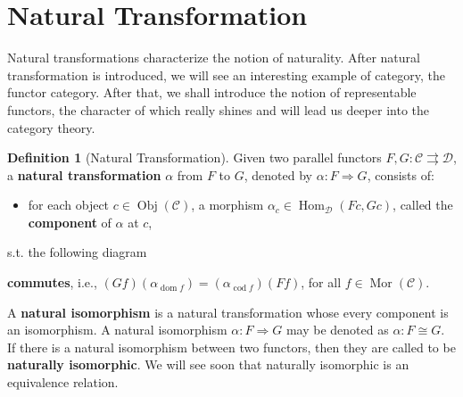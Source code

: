 \documentclass{article}
\theoremstyle{definition}
\newtheorem{definition}{Definition}[section]
\theoremstyle{definition}
\theoremstyle{remark}
\DeclareMathOperator{\Obj}{Obj}
\DeclareMathOperator{\Mor}{Mor}
\DeclareMathOperator{\dom}{dom}
\DeclareMathOperator{\cod}{cod}
\DeclareMathOperator{\Hom}{Hom}
\begin{document}
\section{Natural Transformation}
Natural transformations characterize the notion of naturality. After natural transformation is introduced, we will see an interesting example of category, the functor category. After that, we shall introduce the notion of representable functors, the character of which really shines and will lead us deeper into the category theory.
	\begin{definition}[Natural Transformation]
	Given two parallel functors $F,G:\mathcal{C}\rightrightarrows \mathcal{D}$, a \textbf{natural transformation} $\alpha$ from $F$ to $G$, denoted by $\alpha:F\Rightarrow G$, consists of:
		\begin{itemize}
			\item for each object $c\in\Obj(\mathcal{C})$, a morphism $\alpha_c\in\Hom_\mathcal{D}(Fc,Gc)$, called the \textbf{component} of $\alpha$ at $c$,
		\end{itemize}
		s.t. the following diagram
		\begin{center}
		\end{center}
		\textbf{commutes}, i.e., $(Gf)(\alpha_{\dom f})=(\alpha_{\cod f})(Ff)$, for all $f\in\Mor(\mathcal{C})$.\par
		A \textbf{natural isomorphism} is a natural transformation whose every component is an isomorphism. A natural isomorphism $\alpha:F\Rightarrow G$ may be denoted as $\alpha:F\cong G$. If there is a natural isomorphism between two functors, then they are called to be \textbf{naturally isomorphic}. We will see soon that naturally isomorphic is an equivalence relation.
	\end{definition}
\end{document}
